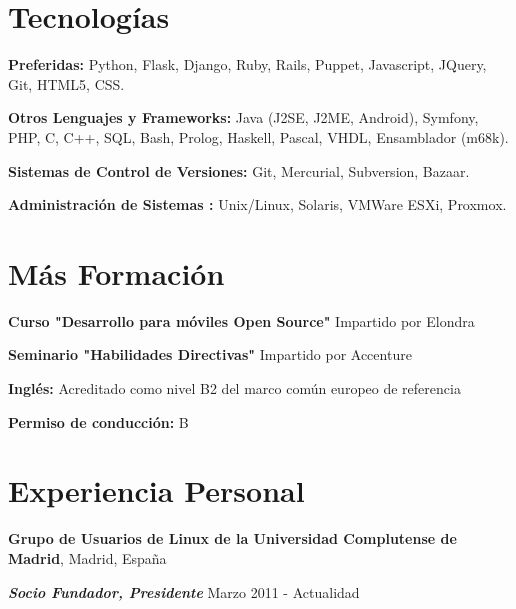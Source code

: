 \documentclass[margin,line]{resume}
\begin{document}
\begin{resume}
\section{\sc Tecnologías} 
\begin{list1}
\item[]{\bf Preferidas:} Python, Flask, Django, Ruby, Rails, Puppet, Javascript, JQuery, Git, HTML5, CSS. 
\item[]{\bf Otros Lenguajes y Frameworks:} Java (J2SE, J2ME, Android), Symfony, PHP, C, C++, SQL, Bash, Prolog, Haskell, Pascal, VHDL, Ensamblador (m68k).
\item[]{\bf Sistemas de Control de Versiones:} Git, Mercurial, Subversion, Bazaar.
\item[]{\bf Administración de Sistemas :} Unix/Linux, Solaris, VMWare ESXi, Proxmox.
\end{list1}

\section{\sc Más Formación } 
\begin{list1}
\item[] {\bf Curso "Desarrollo para móviles Open Source"} Impartido por Elondra
\item[] {\bf Seminario "Habilidades Directivas"} Impartido por Accenture
\item[] {\bf Inglés:} Acreditado como nivel B2 del marco común europeo de referencia
\item[] {\bf Permiso de conducción:} B
\end{list1}


\section{\sc Experiencia Personal}
{\bf Grupo de Usuarios de Linux de la Universidad Complutense de
Madrid}, Madrid, España

\vspace{-.3cm}
{\bf \em Socio Fundador, Presidente} \hfill { Marzo 2011 - Actualidad}



\end{resume}
\end{document}
